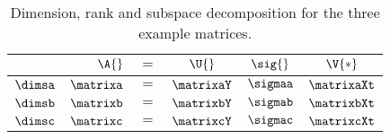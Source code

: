 \begin{table}[htdp]
\caption[Dimension, rank and subspace decomposition]{Dimension, rank and subspace decomposition for the three example matrices.}
\begin{center}
\begin{tabular}{lrcccc}
%
 & $\A{}$ & $=$ & $\U{}$ & $\sig{}$ & $\V{*}$ \\ \hline
%
 $\dimsa$ & $\matrixa $ & $=$ & $\matrixaY$ & $\sigmaa $ & $\matrixaXt$ \\[30pt]
%
 $\dimsb$ & $\matrixb $ & $=$ & $\matrixbY$ & $\sigmab $ & $\matrixbXt$ \\[30pt]
%
 $\dimsc$ & $\matrixc $ & $=$ & $\matrixcY$ & $\sigmac $ & $\matrixcXt$ 
%
\end{tabular}
\end{center}
\label{tab:svden:compare svds}
\end{table}

\endinput